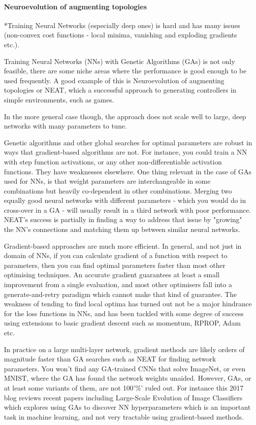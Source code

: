 \paragraph{Neuroevolution of augmenting topologies}
 *Training Neural Networks (especially deep ones) is hard and has many issues (non-convex cost functions - local minima, vanishing and exploding gradients etc.).

 Training Neural Networks (NNs) with Genetic Algorithms (GAs) is not only feasible, there are some niche areas where the performance is good enough to be used frequently. A good example of this is Neuroevolution of augmenting topologies or NEAT, which a successful approach to generating controllers in simple environments, such as games.

 In the more general case though, the approach does not scale well to large, deep networks with many parameters to tune.

 Genetic algorithms and other global searches for optimal parameters are robust in ways that gradient-based algorithms are not. For instance, you could train a NN with step function activations, or any other non-differentiable activation functions. They have weaknesses elsewhere. One thing relevant in the case of GAs used for NNs, is that weight parameters are interchangeable in some combinations but heavily co-dependent in other combinations. Merging two equally good neural networks with different parameters - which you would do in cross-over in a GA - will usually result in a third network with poor performance. NEAT's success is partially in finding a way to address that issue by "growing" the NN's connections and matching them up between similar neural networks.

 Gradient-based approaches are much more efficient. In general, and not just in domain of NNs, if you can calculate gradient of a function with respect to parameters, then you can find optimal parameters faster than most other optimising techniques. An accurate gradient guarantees at least a small improvement from a single evaluation, and most other optimisers fall into a generate-and-retry paradigm which cannot make that kind of guarantee. The weakness of tending to find local optima has turned out not be a major hindrance for the loss functions in NNs, and has been tackled with some degree of success using extensions to basic gradient descent such as momentum, RPROP, Adam etc.

 In practice on a large multi-layer network, gradient methods are likely orders of magnitude faster than GA searches such as NEAT for finding network parameters. You won't find any GA-trained CNNs that solve ImageNet, or even MNIST, where the GA has found the network weights unaided. However, GAs, or at least some variants of them, are not 100'\%' ruled out. For instance this 2017 blog reviews recent papers including Large-Scale Evolution of Image Classifiers which explores using GAs to discover NN hyperparameters which is an important task in machine learning, and not very tractable using gradient-based methods.
